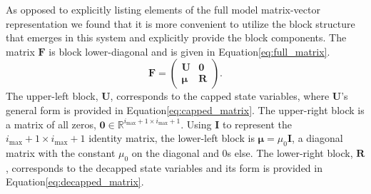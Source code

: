\documentclass[a4,center,fleqn,nocrop]{NAR}
\newcommand{\imax}{\ensuremath{{i_{\max}}}\xspace}
\let\bs\boldsymbol
\begin{document}
As opposed to explicitly listing elements of the full model matrix-vector representation we found that it is more convenient to utilize the block structure that emerges in this system and explicitly provide the block components.
The matrix $\bs{F}$ is block lower-diagonal and is given in Equation\ref{eq:full_matrix}.
\begin{equation*}
\bs{F}=\left(\begin{array}{cc}
\bs{U} & \bs{0} \\
\bs{\mu} & \bs{R}
\end{array} \right).
\end{equation*}
The upper-left block, $\bs{U}$, corresponds to the capped state variables, where $\bs{U}$'s general form is provided in Equation\ref{eq:capped_matrix}.
The upper-right block is a matrix of all zeros, $\bs{0}\in\mathbb{R}^{\imax+1\times \imax+1}$.
Using $\bs{I}$ to represent the $\imax+1\times \imax+1$ identity matrix, the lower-left block is $\bs{\mu}=\mu_0\bs{I}$, a diagonal matrix with the constant $\mu_0$ on the diagonal and 0s else.
The lower-right block, $\bs{R}$, corresponds to the decapped state variables and its form is provided in Equation\ref{eq:decapped_matrix}.
\end{document}
